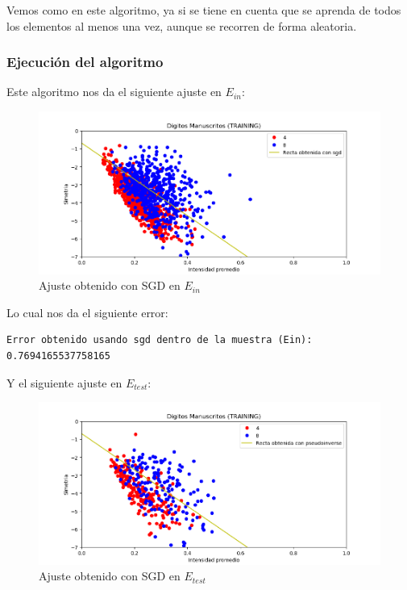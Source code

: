 \documentclass[12pt, spanish]{article}
\begin{document}
Vemos como en este algoritmo, ya si se tiene en cuenta que se aprenda de todos los elementos al menos una vez, aunque se recorren de forma aleatoria.

\subsubsection{Ejecución del algoritmo}

Este algoritmo nos da el siguiente ajuste en $E_{in}$:

\begin{figure}[H]
  \centering
      \includegraphics[scale = 0.70]{bonus_sgd.png}
 		 \caption{Ajuste obtenido con SGD en $E_{in}$}
  		\label{fig:ej2-SGR-RL}

\end{figure}

Lo cual nos da el siguiente error:

\begin{lstlisting}
Error obtenido usando sgd dentro de la muestra (Ein):  0.7694165537758165
\end{lstlisting}


Y el siguiente ajuste en $E_{test}$:

\begin{figure}[H]
  \centering
      \includegraphics[scale = 0.70]{bonus_sgd-test.png}
 		 \caption{Ajuste obtenido con SGD en $E_{test}$}
  		\label{fig:ej2-SGR-RL}

\end{figure}
\end{document}
